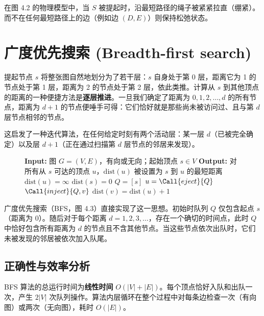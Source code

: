 在图 4.2 的物理模型中，当 $S$ 被提起时，沿最短路径的绳子被紧紧拉直（绷紧）。而不在任何最短路径上的边（例如边 $(D, E)$）则保持松弛状态。

\section{广度优先搜索 (Breadth-first search)}

提起节点 $s$ 将整张图自然地划分为了若干层：$s$ 自身处于第 0 层，距离它为 1 的节点处于第 1 层，距离为 2 的节点处于第 2 层，依此类推。计算从 $s$ 到其他顶点的距离的一种便捷方法是\textbf{逐层推进}。一旦我们确定了距离为 $0, 1, 2, \dots, d$ 的所有节点，距离为 $d + 1$ 的节点便唾手可得：它们恰好就是那些尚未被访问过、且与第 $d$ 层节点相邻的节点。

这启发了一种迭代算法，在任何给定时刻有两个活动层：某一层 $d$（已被完全确定）以及层 $d + 1$（正在通过扫描第 $d$ 层节点的邻居来发现）。

\begin{figure}[htbp]
\centering
\begin{tcolorbox}[colback=white,colframe=gray!50!black,title={\textbf{图 4.3}\quad 广度优先搜索 (\texttt{bfs})}]
\begin{algorithmic}[1]
    \State \textbf{Input:} 图 $G = (V, E)$，有向或无向；起始顶点 $s \in V$
    \State \textbf{Output:} 对所有从 $s$ 可达的顶点 $u$，$\text{dist}(u)$ 被设置为 $s$ 到 $u$ 的最短距离
        \State $\text{dist}(u) = \infty$
    \EndFor
    \State $\text{dist}(s) = 0$
    \State $Q = [s]$ 
        \State $u = \Call{eject}{Q}$ 
                \State $\Call{inject}{Q, v}$ 
                \State $\text{dist}(v) = \text{dist}(u) + 1$
            \EndIf
        \EndFor
    \EndWhile
\EndProcedure
\end{algorithmic}
\end{tcolorbox}
\label{fig:bfs_alg}
\end{figure}

广度优先搜索（BFS，图 4.3）直接实现了这一思想。初始时队列 $Q$ 仅包含起点 $s$（距离为 0）。随后对于每个距离 $d = 1, 2, 3, \dots$，存在一个确切的时间点，此时 $Q$ 中恰好包含所有距离为 $d$ 的节点且不含其他节点。当这些节点依次出队时，它们未被发现的邻居被依次加入队尾。

\subsection*{正确性与效率分析}
BFS 算法的总运行时间为\textbf{线性时间} $O(|V| + |E|)$。每个顶点恰好入队和出队一次，产生 $2|V|$ 次队列操作。算法内层循环在整个过程中对每条边检查一次（有向图）或两次（无向图），耗时 $O(|E|)$。

